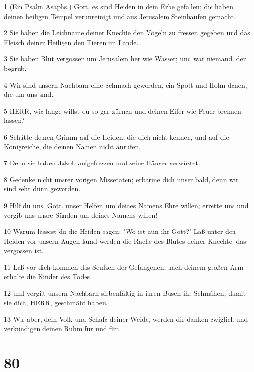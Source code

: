 \par 1 (Ein Psalm Asaphs.) Gott, es sind Heiden in dein Erbe gefallen; die haben deinen heiligen Tempel verunreinigt und aus Jerusalem Steinhaufen gemacht.
\par 2 Sie haben die Leichname deiner Knechte den Vögeln zu fressen gegeben und das Fleisch deiner Heiligen den Tieren im Lande.
\par 3 Sie haben Blut vergossen um Jerusalem her wie Wasser; und war niemand, der begrub.
\par 4 Wir sind unsern Nachbarn eine Schmach geworden, ein Spott und Hohn denen, die um uns sind.
\par 5 HERR, wie lange willst du so gar zürnen und deinen Eifer wie Feuer brennen lassen?
\par 6 Schütte deinen Grimm auf die Heiden, die dich nicht kennen, und auf die Königreiche, die deinen Namen nicht anrufen.
\par 7 Denn sie haben Jakob aufgefressen und seine Häuser verwüstet.
\par 8 Gedenke nicht unsrer vorigen Missetaten; erbarme dich unser bald, denn wir sind sehr dünn geworden.
\par 9 Hilf du uns, Gott, unser Helfer, um deines Namens Ehre willen; errette uns und vergib uns unsre Sünden um deines Namens willen!
\par 10 Warum lässest du die Heiden sagen: "Wo ist nun ihr Gott?" Laß unter den Heiden vor unsern Augen kund werden die Rache des Blutes deiner Knechte, das vergossen ist.
\par 11 Laß vor dich kommen das Seufzen der Gefangenen; nach deinem großen Arm erhalte die Kinder des Todes
\par 12 und vergilt unsern Nachbarn siebenfältig in ihren Busen ihr Schmähen, damit sie dich, HERR, geschmäht haben.
\par 13 Wir aber, dein Volk und Schafe deiner Weide, werden dir danken ewiglich und verkündigen deinen Ruhm für und für.

\chapter{80}


